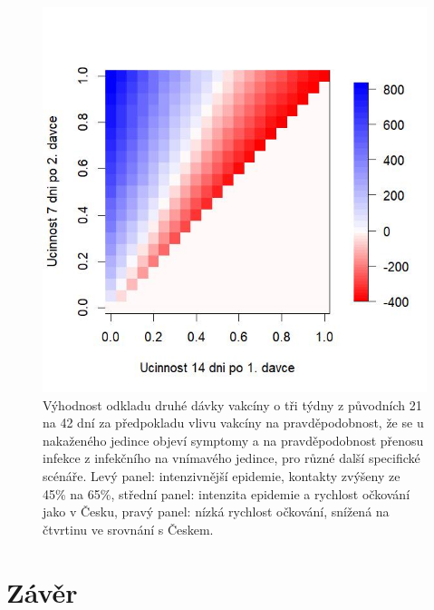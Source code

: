 \begin{figure}[h]
\begin{center}
\begin{minipage}[m]{0.3\linewidth}
		\end{minipage}
		\begin{minipage}[m]{0.3\linewidth}
			\includegraphics[width=\textwidth]{pic/SA4lessL_DIFF_mean_T.jpg}
		\end{minipage}
	\end{center}
	\caption{Výhodnost odkladu druhé dávky vakcíny o tři týdny z původních 21 na 42 dní za předpokladu vlivu vakcíny na pravděpodobnost, že se u nakaženého jedince objeví symptomy a na pravděpodobnost přenosu infekce z infekčního na vnímavého jedince, pro různé další specifické scénáře. Levý panel: intenzivnější epidemie, kontakty zvýšeny ze 45\% na 65\%, střední panel: intenzita epidemie a rychlost očkování jako v Česku, pravý panel: nízká rychlost očkování, snížená na čtvrtinu ve srovnání s Českem.}
	\label{figvacc3}
\end{figure}

\section*{Závěr}


